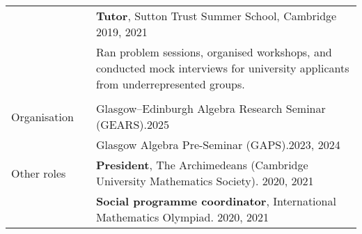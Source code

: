 \documentclass[10pt]{article}
\newcommand{\nextItem}{\\[0.25em]}
\newcommand{\nextSection}{\\[0.5em]}
\begin{document}
\begin{longtable}{>{\raggedleft\arraybackslash}p{0.8in}>{}p{0.05in}>{}p{5.7in}}
        && \textbf{Tutor}, Sutton Trust Summer School, Cambridge \hfill
        2019, 2021\\[0.25em]
        && \begin{minipage}[c]{4.3in}
        Ran problem sessions, organised workshops, and conducted mock interviews
        for university applicants from underrepresented groups.
        \end{minipage}\\\\[-0.4em]
    Organisation
        && Glasgow--Edinburgh Algebra Research Seminar (GEARS).\hfill 2025\nextItem
        && Glasgow Algebra Pre-Seminar (GAPS).\hfill 2023, 2024\nextSection
    Other roles
        && \textbf{President}, The Archimedeans (Cambridge University
        Mathematics Society). \hfill 2020, 2021\nextItem
        && \textbf{Social programme coordinator}, International Mathematics
        Olympiad. \hfill 2020, 2021
\end{longtable}
\end{document}
